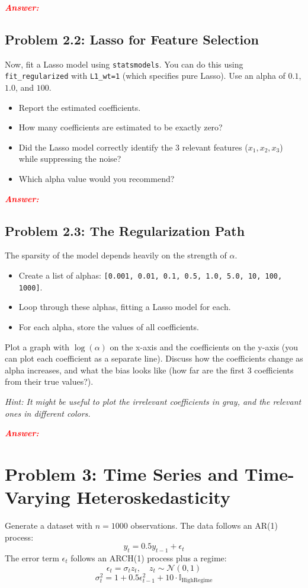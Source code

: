 \documentclass[11pt, letterpaper]{article}
\newcommand{\problem}[1]{\section*{Problem #1}}
\newcommand{\subproblem}[1]{\subsection*{Problem #1}}
\newcommand{\answer}{\textbf{\textit{\textcolor{red}{Answer:}}}\\}
\begin{document}
\answer

\subproblem{2.2: Lasso for Feature Selection}
Now, fit a Lasso model using \texttt{statsmodels}. 
You can do this using \texttt{fit\_regularized} with \texttt{L1\_wt=1} 
(which specifies pure Lasso). Use an alpha of $0.1$, $1.0$, and $100$.
\begin{itemize}
    \item Report the estimated coefficients.
    \item How many coefficients are estimated to be exactly zero?
    \item Did the Lasso model correctly identify the 3 relevant features ($x_1, x_2, x_3$) while suppressing the noise?
    \item Which alpha value would you recommend?
\end{itemize}

\answer

\subproblem{2.3: The Regularization Path}
The sparsity of the model depends heavily on the strength of $\alpha$.
\begin{itemize}
    \item Create a list of alphas: \texttt{[0.001, 0.01, 0.1, 0.5, 1.0, 5.0, 10, 100, 1000]}.
    \item Loop through these alphas, fitting a Lasso model for each.
    \item For each alpha, store the values of all coefficients.
\end{itemize}
Plot a graph with $\log(\alpha)$ on the x-axis and the coefficients on the y-axis (you can plot each coefficient as a separate line).
Discuss how the coefficients change as alpha increases, and what the bias looks like (how far are the first 3 coefficients from their true values?).

\textit{Hint: It might be useful to plot the irrelevant coefficients in gray, and the relevant ones in different colors.}

\answer


\problem{3: Time Series and Time-Varying Heteroskedasticity}

Generate a dataset with $n=1000$ observations. 
The data follows an AR(1) process:
$$ y_t = 0.5 y_{t-1} + \epsilon_t $$
The error term $\epsilon_t$ follows an ARCH(1) process plus a regime:
$$ \epsilon_t = \sigma_t z_t, \quad z_t \sim \mathcal{N}(0,1) $$
$$ \sigma_t^2 = 1 + 0.5 \epsilon_{t-1}^2 + 10 \cdot \mathbb{I}_{\text{HighRegime}} $$
\end{document}
